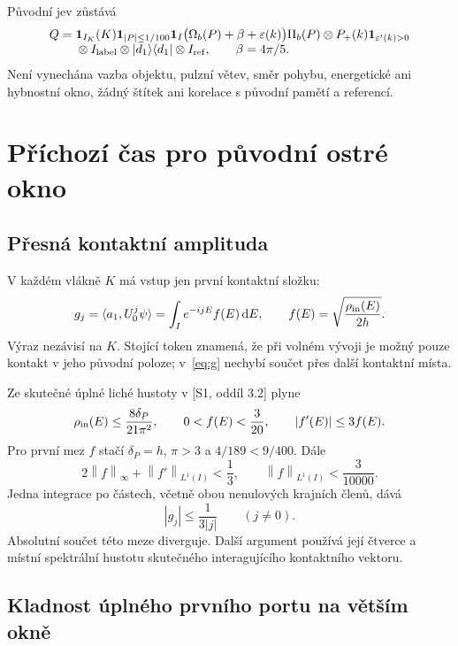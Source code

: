 \documentclass[11pt,a4paper]{article}
\newcommand{\norm}[1]{\left\lVert#1\right\rVert}
\newcommand{\ind}{\mathbf1}
\newcommand{\dd}{\,\mathrm d}
\newcommand{\eps}{\varepsilon}
\theoremstyle{remark}\newtheorem{remark}[theorem]{Poznámka}
\numberwithin{equation}{section}
\begin{document}
Původní jev zůstává
\begin{align}
Q={}&\ind_{I_K}(K)\ind_{|P|\le1/100}
\ind_I\bigl(\Omega_b(P)+\beta+\eps(k)\bigr)\Pi_b(P)
\otimes P_+(k)\ind_{\eps'(k)>0}\notag\\[-1mm]
&\otimes I_{\rm label}\otimes |d_1\rangle\langle d_1|\otimes I_{\rm ref},
\qquad \beta=4\pi/5.
\label{eq:Q}
\end{align}
Není vynechána vazba objektu, pulzní větev, směr pohybu, energetické ani hybnostní okno, žádný štítek ani korelace s původní pamětí a referencí.

\section{Příchozí čas pro původní ostré okno}
\label{sec:incoming}

\subsection{Přesná kontaktní amplituda}

V každém vlákně \(K\) má vstup jen první kontaktní složku:
\begin{equation}
g_j=\langle a_1,U_0^j\psi\rangle
=\int_I e^{-ijE}f(E)\dd E,\qquad
f(E)=\sqrt{\frac{\rho_{\rm in}(E)}{2h}}.
\label{eq:g}
\end{equation}
Výraz nezávisí na \(K\). Stojící token znamená, že při volném vývoji je možný pouze kontakt v jeho původní poloze; v~\eqref{eq:g} nechybí součet přes další kontaktní místa.

Ze skutečné úplné liché hustoty v [S1, oddíl 3.2] plyne
\[
\rho_{\rm in}(E)\le\frac{8\delta_P}{21\pi^2},\qquad
0<f(E)<\frac3{20},\qquad |f'(E)|\le3f(E).
\]
Pro první mez \(f\) stačí \(\delta_P=h\), \(\pi>3\) a
\(4/189<9/400\). Dále
\begin{equation}
2\norm f_\infty+\norm{f'}_{L^1(I)}<\frac13,
\qquad \norm f_{L^1(I)}<\frac3{10000}.
\label{eq:f-bounds}
\end{equation}
Jedna integrace po částech, včetně obou nenulových krajních členů, dává
\begin{equation}
|g_j|\le\frac1{3|j|}\qquad (j\ne0).
\label{eq:g-tail}
\end{equation}
Absolutní součet této meze diverguje. Další argument používá její čtverce a místní spektrální hustotu skutečného interagujícího kontaktního vektoru.

\subsection{Kladnost úplného prvního portu na větším okně}
\end{document}
